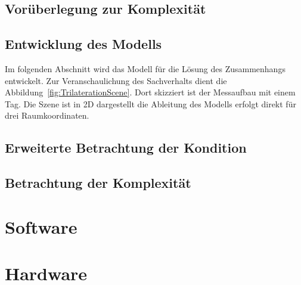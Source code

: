 \subsection{Vorüberlegung zur Komplexität}
\label{sec:Komplexity1}

%
\subsection{Entwicklung des Modells}
\label{sec:model_developement}
Im folgenden Abschnitt wird das Modell für die Lösung des Zusammenhangs entwickelt. Zur Veranschaulichung des Sachverhalts dient die Abbildung~\ref{fig:TrilaterationScene}. Dort skizziert ist der Messaufbau mit einem Tag. Die Szene ist in 2D dargestellt die Ableitung des Modells erfolgt direkt für drei Raumkoordinaten.
%



%
\subsection{Erweiterte Betrachtung der Kondition}

%
%
\subsection{Betrachtung der Komplexität}
\label{sec:Komplexity2}


\section{Software}
\label{sec:sw}
\lipsum[1-3]

\section{Hardware}
\label{sec:hw}
\lipsum[1-3]

